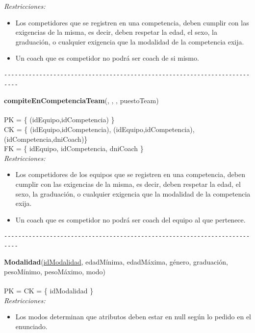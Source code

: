 \textit{Restricciones:}
\begin{itemize}
	\item Los competidores que se registren en una competencia, deben cumplir con las exigencias de la misma, es decir, deben respetar la edad, el sexo, la graduación, o cualquier exigencia que la modalidad de la competencia exija.
	\item Un coach que es competidor no podrá ser coach de si mismo.
\end{itemize}


\begin{verbatim}
--------------------------------------------------------------------------
\end{verbatim}

\noindent\textbf{compiteEnCompetenciaTeam}(, , , puestoTeam)
\\
\\
PK = \{ (idEquipo,idCompetencia) \} \\
CK = \{ (idEquipo,idCompetencia), (idEquipo,idCompetencia), (idCompetencia,dniCoach)\} \\
FK = \{ idEquipo, idCompetencia, dniCoach \} \\

\textit{Restricciones:}
\begin{itemize}
	\item Los competidores de los equipos que se registren en una competencia, deben cumplir con las exigencias de la misma, es decir, deben respetar la edad, el sexo, la graduación, o cualquier exigencia que la modalidad de la competencia exija.
	\item Un coach que es competidor no podrá ser coach del equipo al que pertenece.
\end{itemize}

\begin{verbatim}
--------------------------------------------------------------------------
\end{verbatim}

\noindent\textbf{Modalidad}(\uline{idModalidad}, edadMínima, edadMáxima, género, graduación, pesoMínimo, pesoMáximo, modo)
\\
\\
PK = CK = \{ idModalidad \} \\
\textit{Restricciones:}
\begin{itemize}
	\item Los modos determinan que atributos deben estar en null según lo pedido en el enunciado.
\end{itemize}


